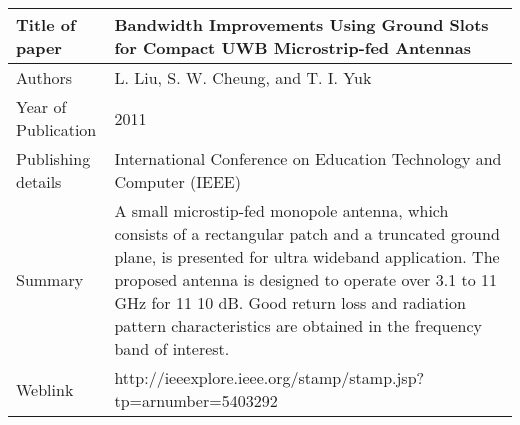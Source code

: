 \documentclass{article}
\begin{document}
\begin{table}
  \centering
	\begin{tabular}{ |l|p{11cm}| }
			\hline
		     Title of paper &  Bandwidth Improvements Using Ground Slots for Compact UWB Microstrip-fed Antennas \\
		     \hline
			 Authors & L. Liu, S. W. Cheung, and T. I. Yuk \\
			\hline
			 Year of Publication & 2011 \\
			\hline
			 Publishing details & International Conference on Education Technology and Computer (IEEE) \\ \hline
			 Summary & A small microstip-fed monopole antenna, which consists of a rectangular patch and a truncated ground plane, is presented for ultra wideband application. The proposed antenna is designed to operate over 3.1 to 11 GHz for 11 10 dB. Good return loss and radiation pattern characteristics are obtained in the frequency band of interest.\\
			\hline
			 Weblink & http://ieeexplore.ieee.org/stamp/stamp.jsp?tp=arnumber=5403292 \\
			 \hline			 
	\end{tabular}		

\end{table}
\end{document}
